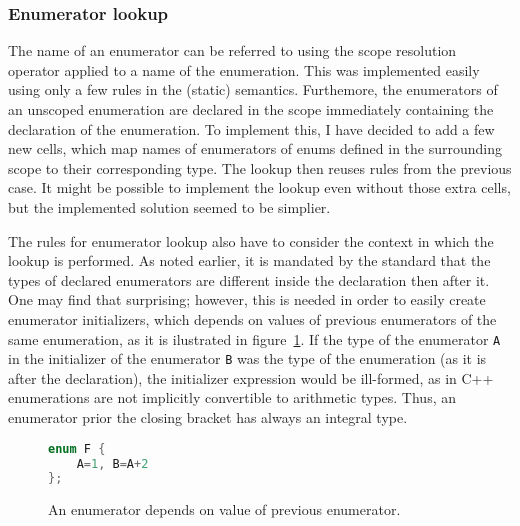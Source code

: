 \documentclass{fithesis3}
\begin{document}


\subsubsection{Enumerator lookup}

The name of an enumerator can be referred to using the scope resolution operator applied to a name of the enumeration. This was implemented easily using only a few rules in the (static) semantics.
Furthemore, the enumerators of an unscoped enumeration are declared in the scope immediately containing the declaration of the enumeration. To implement this, I have decided to add a few new cells, which map names of enumerators of enums defined in the surrounding scope to their corresponding type. The lookup then reuses rules from the previous case. It might be possible to implement the lookup even without those extra cells, but the implemented solution seemed to be simplier.

The rules for enumerator lookup also have to consider the context in which the lookup is performed. As noted earlier, it is mandated by the standard that the types of declared enumerators are different inside the declaration then after it. One may find that surprising; however, this is needed in order to easily create enumerator initializers, which depends on values of previous enumerators of the same enumeration, as it is ilustrated in figure~\ref{lst:enumDepends}. If the type of the enumerator \lstinline{A} in the initializer of the enumerator \lstinline{B} was the type of the enumeration (as it is after the declaration), the initializer expression would be ill-formed, as in C++ enumerations are not implicitly convertible to arithmetic types. Thus, an enumerator prior the closing bracket has always an integral type.



\begin{figure}[h]
\begin{lstlisting}[language=C++]
enum F {
	A=1, B=A+2
};
\end{lstlisting}
\caption{An enumerator depends on value of previous enumerator.}
\label{lst:enumDepends}
\end{figure}
\end{document}
